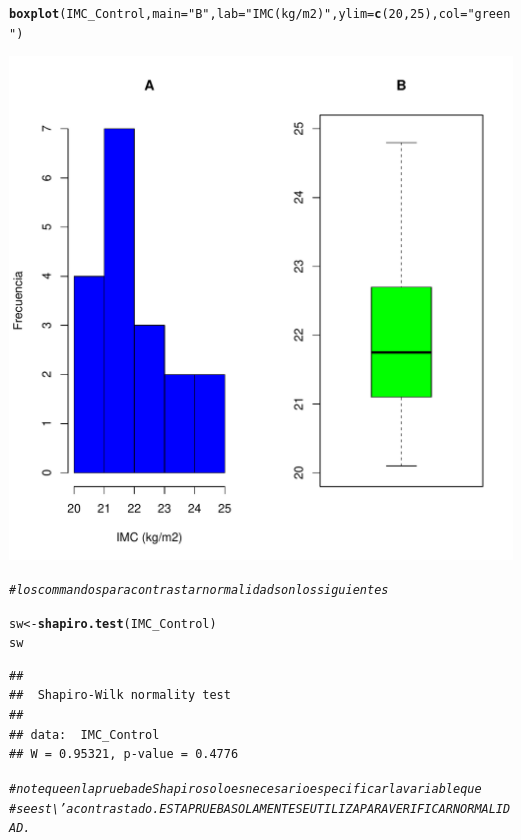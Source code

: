 \documentclass[12pt,letterpaper]{article}\usepackage[]{graphicx}\usepackage[]{color}
\makeatletter
\def\maxwidth{ %
  \ifdim\Gin@nat@width>\linewidth
    \linewidth
  \else
    \Gin@nat@width
  \fi
}
\newcommand{\hlnum}[1]{\textcolor[rgb]{0.686,0.059,0.569}{#1}}%
\newcommand{\hlstr}[1]{\textcolor[rgb]{0.192,0.494,0.8}{#1}}%
\newcommand{\hlcom}[1]{\textcolor[rgb]{0.678,0.584,0.686}{\textit{#1}}}%
\newcommand{\hlstd}[1]{\textcolor[rgb]{0.345,0.345,0.345}{#1}}%
\newcommand{\hlkwb}[1]{\textcolor[rgb]{0.69,0.353,0.396}{#1}}%
\newcommand{\hlkwc}[1]{\textcolor[rgb]{0.333,0.667,0.333}{#1}}%
\newcommand{\hlkwd}[1]{\textcolor[rgb]{0.737,0.353,0.396}{\textbf{#1}}}%
\newenvironment{kframe}{%
 \def\at@end@of@kframe{}%
 \ifinner\ifhmode%
  \def\at@end@of@kframe{\end{minipage}}%
  \begin{minipage}{\columnwidth}%
 \fi\fi%
 \def\FrameCommand##1{\hskip\@totalleftmargin \hskip-\fboxsep
 \colorbox{shadecolor}{##1}\hskip-\fboxsep
     \hskip-\linewidth \hskip-\@totalleftmargin \hskip\columnwidth}%
 \MakeFramed {\advance\hsize-\width
   \@totalleftmargin\z@ \linewidth\hsize
   \@setminipage}}%
 {\par\unskip\endMakeFramed%
 \at@end@of@kframe}
\newenvironment{knitrout}{}{} %
\makeatother
\begin{document}
\begin{knitrout}
\begin{kframe}
\begin{alltt}
\hlkwd{boxplot}\hlstd{(IMC_Control,}\hlkwc{main}\hlstd{=}\hlstr{"B"}\hlstd{,} \hlkwc{lab}\hlstd{=}\hlstr{"IMC (kg/m2)"}\hlstd{,}\hlkwc{ylim}\hlstd{=}\hlkwd{c}\hlstd{(}\hlnum{20}\hlstd{,}\hlnum{25}\hlstd{),} \hlkwc{col}\hlstd{=}\hlstr{"green"}\hlstd{)}
\end{alltt}
\end{kframe}
\includegraphics[width=\maxwidth]{figure/unnamed-chunk-3-1} 
\begin{kframe}\begin{alltt}
\hlcom{# los commandos para contrastar normalidad son los siguientes }

\hlstd{sw} \hlkwb{<-} \hlkwd{shapiro.test}\hlstd{(IMC_Control)}
\hlstd{sw}
\end{alltt}
\begin{verbatim}
## 
## 	Shapiro-Wilk normality test
## 
## data:  IMC_Control
## W = 0.95321, p-value = 0.4776
\end{verbatim}
\begin{alltt}
\hlcom{# note que en la prueba de Shapiro solo es necesario especificar la variable que }
\hlcom{# se est\textbackslash{}'a contrastado. ESTA PRUEBA SOLAMENTE SEUTILIZA PARA VERIFICAR NORMALIDAD. }


\end{alltt}
\end{kframe}
\end{knitrout}
\end{document}
